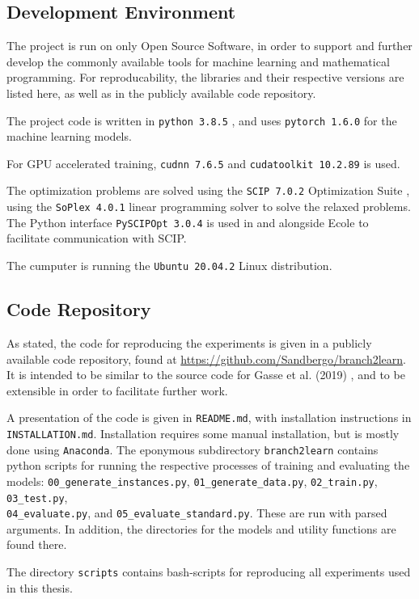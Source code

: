 \subsection{Development Environment}

The project is run on only Open Source Software, in order to support and further develop the commonly available tools for machine learning and mathematical programming. For reproducability, the libraries and their respective versions are listed here, as well as in the publicly available code repository. 

The project code is written in 
\verb|python 3.8.5| \cite{rossum2009python}, and uses               
\verb|pytorch 1.6.0| \cite{paszke2019pytorch} for the machine learning models.           

For \gls{GPU} accelerated training, 
\verb|cudnn 7.6.5| and 
\verb|cudatoolkit 10.2.89| \cite{kirk2008nvidia} is used. 

The optimization problems are solved using the \verb|SCIP 7.0.2| Optimization Suite \cite{gamrath2020scip}, using the 
\verb|SoPlex 4.0.1| \cite{wunderling1996soplex} linear programming solver to solve the relaxed problems. The Python interface
\verb|PySCIPOpt 3.0.4| \cite{maher2016pyscipopt} is used in and alongside \gls{Ecole} to facilitate communication with \gls{SCIP}.

The cumputer is running the \verb|Ubuntu 20.04.2| Linux distribution.


\subsection{Code Repository}

As stated, the code for reproducing the experiments is given in a publicly available code repository, found at \url{https://github.com/Sandbergo/branch2learn}. It is intended to be similar to the source code for Gasse et al. (2019) \cite{gasse2019exact}, and to be extensible in order to facilitate further work. 

A presentation of the code is given in \verb|README.md|, with installation instructions in \verb|INSTALLATION.md|. Installation requires some manual installation, but is mostly done using \verb|Anaconda|. The eponymous subdirectory \verb|branch2learn| contains python scripts for running the respective processes of training and evaluating the models: \verb|00_generate_instances.py|, \verb|01_generate_data.py|, \verb|02_train.py|,
\verb|03_test.py|, \\
\verb|04_evaluate.py|, and \verb|05_evaluate_standard.py|.  These are run with parsed arguments. In addition, the directories for the models and utility functions are found there.

The directory \verb|scripts| contains bash-scripts for reproducing all experiments used in this thesis. 